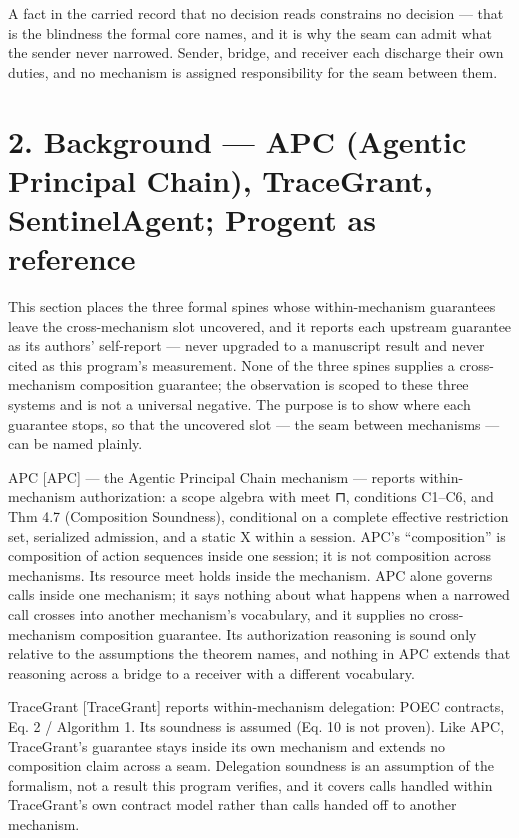 \documentclass[
  10pt,
]{article}
\renewcommand{\_}{\origunderscore\allowbreak}
\begin{document}
A fact in the carried record that no decision reads constrains no
decision --- that is the blindness the formal core names, and it is why
the seam can admit what the sender never narrowed. Sender, bridge, and
receiver each discharge their own duties, and no mechanism is assigned
responsibility for the seam between them.

\section{2. Background --- APC (Agentic Principal Chain), TraceGrant,
SentinelAgent; Progent as
reference}\label{background-apc-agentic-principal-chain-tracegrant-sentinelagent-progent-as-reference}

This section places the three formal spines whose within-mechanism
guarantees leave the cross-mechanism slot uncovered, and it reports each
upstream guarantee as its authors' self-report --- never upgraded to a
manuscript result and never cited as this program's measurement. None of
the three spines supplies a cross-mechanism composition guarantee; the
observation is scoped to these three systems and is not a universal
negative. The purpose is to show where each guarantee stops, so that the
uncovered slot --- the seam between mechanisms --- can be named plainly.

APC {[}APC{]} --- the Agentic Principal Chain mechanism --- reports
within-mechanism authorization: a scope algebra with meet ⊓, conditions
C1--C6, and Thm 4.7 (Composition Soundness), conditional on a complete
effective restriction set, serialized admission, and a static X within a
session. APC's ``composition'' is composition of action sequences inside
one session; it is not composition across mechanisms. Its resource meet
holds inside the mechanism. APC alone governs calls inside one
mechanism; it says nothing about what happens when a narrowed call
crosses into another mechanism's vocabulary, and it supplies no
cross-mechanism composition guarantee. Its authorization reasoning is
sound only relative to the assumptions the theorem names, and nothing in
APC extends that reasoning across a bridge to a receiver with a
different vocabulary.

TraceGrant {[}TraceGrant{]} reports within-mechanism delegation: POEC
contracts, Eq. 2 / Algorithm 1. Its soundness is assumed (Eq. 10 is not
proven). Like APC, TraceGrant's guarantee stays inside its own mechanism
and extends no composition claim across a seam. Delegation soundness is
an assumption of the formalism, not a result this program verifies, and
it covers calls handled within TraceGrant's own contract model rather
than calls handed off to another mechanism.
\end{document}
